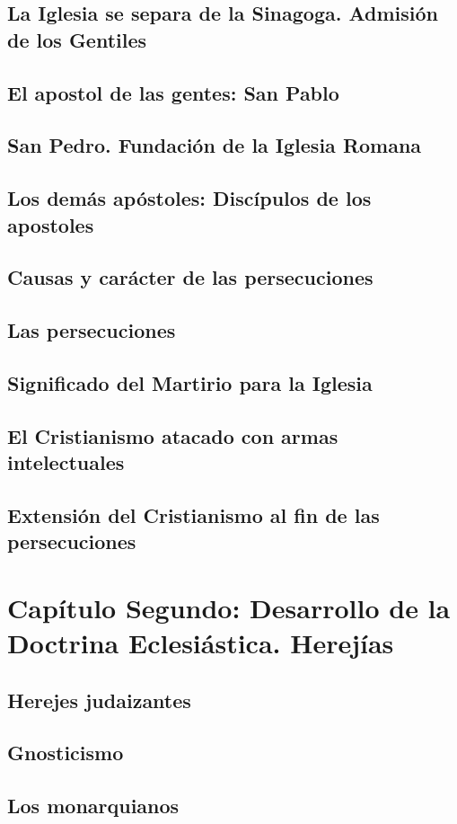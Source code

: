 \raggedbottom{} \documentclass[12pt, a4paper, openany]{book} %
\begin{document}
\section{La Iglesia se separa de la Sinagoga. Admisión de los Gentiles}
\section{El apostol de las gentes: San Pablo}
\section{San Pedro. Fundación de la Iglesia Romana}
\section{Los demás apóstoles: Discípulos de los apostoles}
\section{Causas y carácter de las persecuciones}
\section{Las persecuciones}
\section{Significado del Martirio para la Iglesia}
\section{El Cristianismo atacado con armas intelectuales}
\section{Extensión del Cristianismo al fin de las persecuciones}
\chapter{Capítulo Segundo: Desarrollo de la Doctrina Eclesiástica. Herejías}
\section{Herejes judaizantes}
\section{Gnosticismo}
\section{Los monarquianos}
\end{document}
